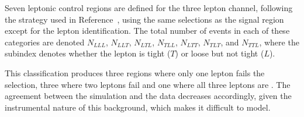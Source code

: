 \label{sec:lepCR3l}


Seven leptonic control regions are defined for the three lepton channel, following the strategy used in Reference~\cite{SMP-20-014},
using the same selections as the signal region except for the lepton identification.
The total number of events in each of these categories are denoted
$N_{LLL}$, $N_{LLT}$, $N_{LTL}$, $N_{TLL}$, $N_{LTT}$, $N_{TLT}$, and $N_{TTL}$, where the subindex denotes whether the lepton is tight ($T$) or loose but not tight ($L$).

This classification produces three regions where only one lepton fails the selection, three where two leptons fail and one where all three leptons are \nonprompt.
The agreement between the simulation and the data decreases accordingly, given the instrumental nature of this background, which makes it difficult to model.

